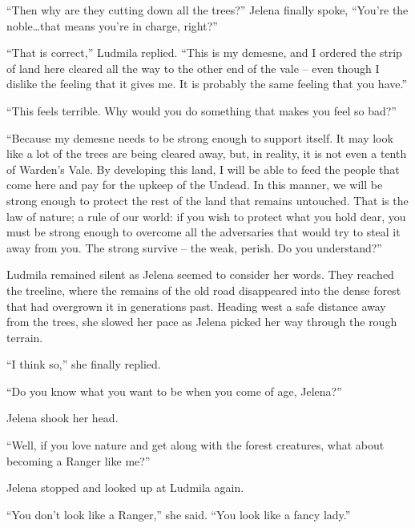  

“Then why are they cutting down all the trees?” Jelena finally spoke, “You’re the noble…that means you’re in charge, right?”

 

“That is correct,” Ludmila replied. “This is my demesne, and I ordered the strip of land here cleared all the way to the other end of the vale – even though I dislike the feeling that it gives me. It is probably the same feeling that you have.”

 

“This feels terrible. Why would you do something that makes you feel so bad?”

 

“Because my demesne needs to be strong enough to support itself. It may look like a lot of the trees are being cleared away, but, in reality, it is not even a tenth of Warden’s Vale. By developing this land, I will be able to feed the people that come here and pay for the upkeep of the Undead. In this manner, we will be strong enough to protect the rest of the land that remains untouched. That is the law of nature; a rule of our world: if you wish to protect what you hold dear, you must be strong enough to overcome all the adversaries that would try to steal it away from you. The strong survive – the weak, perish. Do you understand?”

 

Ludmila remained silent as Jelena seemed to consider her words. They reached the treeline, where the remains of the old road disappeared into the dense forest that had overgrown it in generations past. Heading west a safe distance away from the trees, she slowed her pace as Jelena picked her way through the rough terrain.

 

“I think so,” she finally replied.

 

“Do you know what you want to be when you come of age, Jelena?”

 

Jelena shook her head.

 

“Well, if you love nature and get along with the forest creatures, what about becoming a Ranger like me?”

 

Jelena stopped and looked up at Ludmila again.

 

“You don’t look like a Ranger,” she said. “You look like a fancy lady.”

